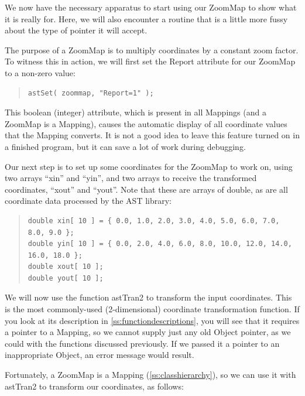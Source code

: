 \documentclass[twoside,11pt]{article}
\newcommand{\htmlref}[2]{#1}
\newcommand{\appref}[1]{Appendix~\ref{#1}}
\renewcommand{\appref}[1]{\ref{#1}}
\begin{document}
We now have the necessary apparatus to start using our \htmlref{ZoomMap}{ZoomMap} to show
what it is really for. Here, we will also encounter a routine that is
a little more fussy about the type of pointer it will accept.

The purpose of a ZoomMap is to multiply coordinates by a constant zoom
factor. To witness this in action, we will first set the \htmlref{Report}{Report}
attribute for our ZoomMap to a non-zero value:

\begin{quote}
\small
\begin{verbatim}
astSet( zoommap, "Report=1" );
\end{verbatim}
\normalsize
\end{quote}

This boolean (integer) attribute, which is present in all Mappings
(and a ZoomMap is a \htmlref{Mapping}{Mapping}), causes the automatic display of all
coordinate values that the Mapping converts. It is not a good idea to
leave this feature turned on in a finished program, but it can save a
lot of work during debugging.

Our next step is to set up some coordinates for the ZoomMap to work
on, using two arrays ``xin'' and ``yin'', and two arrays to receive
the transformed coordinates, ``xout'' and ``yout''.  Note that these
are arrays of double, as are all coordinate data processed by the AST
library:

\begin{quote}
\small
\begin{verbatim}
double xin[ 10 ] = { 0.0, 1.0, 2.0, 3.0, 4.0, 5.0, 6.0, 7.0, 8.0, 9.0 };
double yin[ 10 ] = { 0.0, 2.0, 4.0, 6.0, 8.0, 10.0, 12.0, 14.0, 16.0, 18.0 };
double xout[ 10 ];
double yout[ 10 ];
\end{verbatim}
\normalsize
\end{quote}

We will now use the function \htmlref{astTran2}{astTran2} to transform the input
coordinates. This is the most commonly-used (2-dimensional) coordinate
transformation function. If you look at its description in
\appref{ss:functiondescriptions}, you will see that it requires a
pointer to a Mapping, so we cannot supply just any old \htmlref{Object}{Object} pointer,
as we could with the functions discussed previously. If we passed it a
pointer to an inappropriate Object, an error message would result.

Fortunately, a ZoomMap is a Mapping (\appref{ss:classhierarchy}), so we
can use it with astTran2 to transform our coordinates, as follows:
\end{document}
